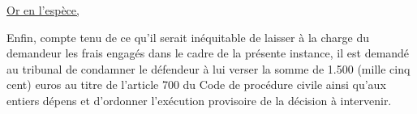 \documentclass[12pt,a4paper]{article}
\newenvironment{changemargin}[2]{%
\begin{list}{}{%
\setlength{\topsep}{0pt}%
\setlength{\leftmargin}{#1}%
\setlength{\rightmargin}{#2}%
\setlength{\listparindent}{\parindent}%
\setlength{\itemindent}{\parindent}%
\setlength{\parsep}{\parskip}
}%
\item[]}{\end{list}}
\begin{document}
\lipsum[3]

\vspace{08mm}

\underline{Or en l'espèce,}\\

\lipsum[2]
\vspace{05mm}

\begin{changemargin}{1cm}{0.1cm}
\end{changemargin}
\vspace{05mm}

\lipsum[1-2]
\vspace{05mm}

\begin{changemargin}{1cm}{0.1cm}
\end{changemargin}
\vspace{05mm}

\lipsum[3-5]

\vspace{05mm}

\begin{siderules}
\lipsum[1-3]
\end{siderules}

\vspace{05mm}

\begin{changemargin}{1cm}{0.1cm}
\end{changemargin}

\vspace{05mm}

\lipsum[3-4]

\vspace{05mm}

Enfin, compte tenu de ce qu'il serait inéquitable de laisser à la charge du demandeur les frais engagés dans le cadre de la présente instance, il est demandé au tribunal de condamner le défendeur à lui verser la somme de 1.500 (mille cinq cent) euros au titre de l'article 700 du Code de procédure civile ainsi qu'aux entiers dépens et d'ordonner l'exécution provisoire de la décision à intervenir.

\pagebreak

\end{document}
